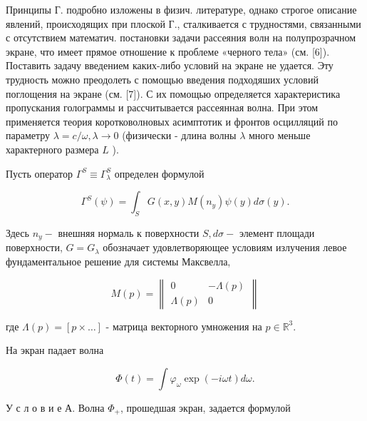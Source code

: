 \documentclass[10pt]{article}
\begin{document}
Принципы Г. подробно изложены в физич. литературе, однако строгое описание явлений, происходящих при плоской Г., сталкивается с трудностями, связанными с отсутствием математич. постановки задачи рассеяния волн на полупрозрачном экране, что имеет прямое отношение к проблеме «черного тела» (см. [6]). Поставить задачу введением каких-либо условий на экране не удается. Эту трудность можно преодолеть с помощью введения подходяших условий поглощения на экране (см. [7]). С их помощью определяется характеристика пропускания голограммы и рассчитывается рассеянная волна. При этом применяется теория коротковолновых асимптотик и фронтов осцилляций по параметру $\lambda=c / \omega, \lambda \rightarrow 0$ (физически - длина волны $\lambda$ много меньше характерного размера $L$ ).



Пусть оператор $\Gamma^{S} \equiv \Gamma_{\lambda}^{S}$ определен формулой



\[

\Gamma^{S}(\psi)=\int_{S} G(x, y) M\left(n_{y}\right) \psi(y) d \sigma(y) .

\]



Здесь $n_{y}-$ внешняя нормаль к поверхности $S, d \sigma-$ элемент площади поверхности, $G=G_{\lambda}$ обозначает удовлетворяющее условиям излучения левое фундаментальное решение для системы Максвелла,



\[

M(p)=\left\|\begin{array}{cc}

0 & -\Lambda(p) \\

\Lambda(p) & 0

\end{array}\right\|

\]



где $\Lambda(p)=[p \times \ldots]$ - матрица векторного умножения на $p \in \mathbb{R}^{3}$.



На экран падает волна



\[

\Phi(t)=\int \varphi_{\omega} \exp (-i \omega t) d \omega .

\]



У с л о в и е А. Волна $\Phi_{+}$, прошедшая экран, задается формулой
\end{document}
